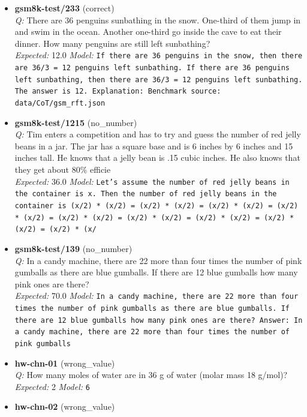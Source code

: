 \begin{itemize}\setlength\itemsep{0.6em}
\item[] \textbf{gsm8k-test/233} (correct)\\
\textit{Q:} There are 36 penguins sunbathing in the snow.  One-third of them jump in and swim in the ocean.  Another one-third go inside the cave to eat their dinner.  How many penguins are still left sunbathing?\\
\textit{Expected:} 12.0 \quad \textit{Model:} \texttt{If there are 36 penguins in the snow, then there are 36/3 = 12 penguins left sunbathing. If there are 36 penguins left sunbathing, then there are 36/3 = 12 penguins left sunbathing. The answer is 12. Explanation: Benchmark source: data/CoT/gsm\_rft.json}
\item[] \textbf{gsm8k-test/1215} (no\_number)\\
\textit{Q:} Tim enters a competition and has to try and guess the number of red jelly beans in a jar.  The jar has a square base and is 6 inches by 6 inches and 15 inches tall.  He knows that a jelly bean is .15 cubic inches.  He also knows that they get about 80\% efficie\\
\textit{Expected:} 36.0 \quad \textit{Model:} \texttt{Let's assume the number of red jelly beans in the container is x. Then the number of red jelly beans in the container is (x/2) * (x/2) = (x/2) * (x/2) = (x/2) * (x/2) = (x/2) * (x/2) = (x/2) * (x/2) = (x/2) * (x/2) = (x/2) * (x/2) = (x/2) * (x/2) = (x/2) * (x/}
\item[] \textbf{gsm8k-test/139} (no\_number)\\
\textit{Q:} In a candy machine, there are 22 more than four times the number of pink gumballs as there are blue gumballs. If there are 12 blue gumballs how many pink ones are there?\\
\textit{Expected:} 70.0 \quad \textit{Model:} \texttt{In a candy machine, there are 22 more than four times the number of pink gumballs as there are blue gumballs. If there are 12 blue gumballs how many pink ones are there? Answer: In a candy machine, there are 22 more than four times the number of pink gumballs }
\item[] \textbf{hw-chn-01} (wrong\_value)\\
\textit{Q:} How many moles of water are in 36 g of water (molar mass 18 g/mol)?\\
\textit{Expected:} 2 \quad \textit{Model:} \texttt{6}
\item[] \textbf{hw-chn-02} (wrong\_value)\\

\end{itemize}
